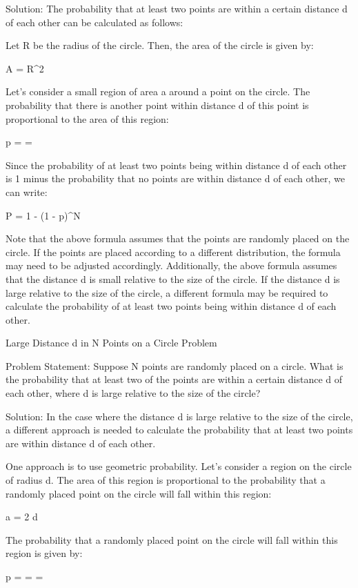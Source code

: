 \documentclass[12pt, a4paper, oneside]{article}
\begin{document}
Solution:
The probability that at least two points are within a certain distance d of each other can be calculated as follows:

Let R be the radius of the circle. Then, the area of the circle is given by:

A = \pi R^2

Let's consider a small region of area a around a point on the circle. The probability that there is another point within distance d of this point is proportional to the area of this region:

p =  = 

Since the probability of at least two points being within distance d of each other is 1 minus the probability that no points are within distance d of each other, we can write:

P = 1 - (1 - p)^N

Note that the above formula assumes that the points are randomly placed on the circle. If the points are placed according to a different distribution, the formula may need to be adjusted accordingly. Additionally, the above formula assumes that the distance d is small relative to the size of the circle. If the distance d is large relative to the size of the circle, a different formula may be required to calculate the probability of at least two points being within distance d of each other.

Large Distance d in N Points on a Circle Problem

Problem Statement:
Suppose N points are randomly placed on a circle. What is the probability that at least two of the points are within a certain distance d of each other, where d is large relative to the size of the circle?

Solution:
In the case where the distance d is large relative to the size of the circle, a different approach is needed to calculate the probability that at least two points are within distance d of each other.

One approach is to use geometric probability. Let's consider a region on the circle of radius d. The area of this region is proportional to the probability that a randomly placed point on the circle will fall within this region:

a = 2 \pi d

The probability that a randomly placed point on the circle will fall within this region is given by:

p =  =  = 
\end{document}
